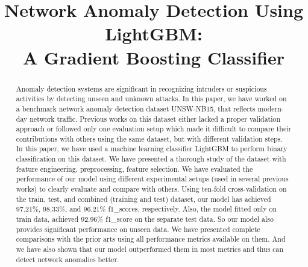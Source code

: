 \documentclass[14pt, conference]{IEEEtran}
\begin{document}
\title{Network Anomaly Detection Using LightGBM: \\ A Gradient Boosting Classifier}

\author{

}

\maketitle

\begin{abstract}
Anomaly detection systems are significant in recognizing intruders or suspicious activities by detecting unseen and unknown attacks. In this paper, we have worked on a benchmark network anomaly detection dataset UNSW-NB15, that reflects modern-day network traffic. Previous works on this dataset either lacked a proper validation approach or followed only one evaluation setup which made it difficult to compare their contributions with others using the same dataset, but with different validation steps. In this paper, we have used a machine learning classifier LightGBM to perform binary classification on this dataset. We have presented a thorough study of the dataset with feature engineering, preprocessing, feature selection. We have evaluated the performance of our model using different experimental setups (used in several previous works)  to clearly evaluate and compare with others. Using ten-fold cross-validation on the train, test, and combined (training and test) dataset, our model has achieved 97.21\%, 98.33\%, and 96.21\% f1\_scores, respectively. Also, the model fitted only on train data, achieved 92.96\% f1\_score on the separate test data. So our model also provides significant performance on unseen data. We have presented complete comparisons with the prior arts using all performance metrics available on them. And we have also shown that our model outperformed them in most metrics and thus can detect network anomalies better.

\end{abstract}
\end{document}
